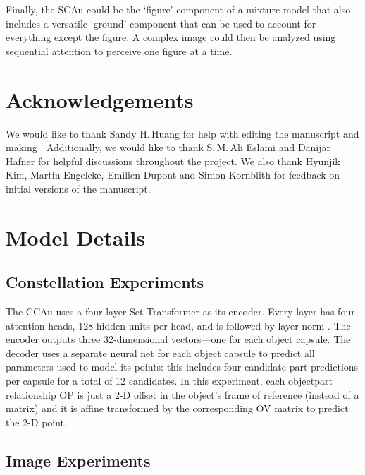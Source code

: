 \documentclass{article}
\begin{document}
Finally, the \gls{SCAu} could be the `figure' component of a mixture model that also includes a versatile `ground' component that can be used to account for everything except the figure.  A complex image could then be analyzed using sequential attention to perceive one figure at a time.  \section{Acknowledgements}
We would like to thank Sandy H.\,Huang for help with editing the manuscript and making .
Additionally, we would like to thank S.\,M.\,Ali Eslami and Danijar Hafner for helpful discussions throughout the project. We also thank Hyunjik Kim, Martin Engelcke, Emilien Dupont and Simon Kornblith for feedback on initial versions of the manuscript. 
\pagebreak

\printbibliography

\newpage
\appendix
\section{Model Details}
\label{app:models}

\subsection{Constellation Experiments}
\label{app:constellation_model}
The \gls{CCAu} uses a four-layer Set Transformer as its encoder.
Every layer has four attention heads, 128 hidden units per head, and is followed by layer norm \citep{Ba2016layern}.
The encoder outputs three 32-dimensional vectors---one for each object capsule.
The decoder uses a separate neural net for each object capsule to predict all parameters used to model its points: this includes four candidate part predictions per capsule for a total of 12 candidates.
In this experiment, each objectpart relationship \gls{OP} is just a 2-D offset in the object's frame of reference (instead of a  matrix) and it is affine transformed by the corresponding \gls{OV} matrix to predict the 2-D point.

\subsection{Image Experiments}
\end{document}
